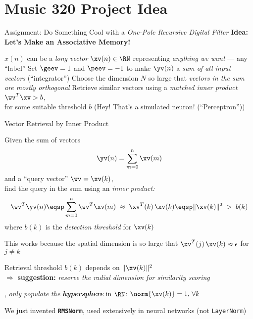 

%

%

\section[\sectopts,toc={Basic Idea}]{Music 320 Project Idea}

\begin{slide}[\slideopts,toc={One Pole Filter}]{Assignment: Do Something Cool with a \emph{One-Pole Recursive Digital Filter}}
\vspace{-1em}
\maybepause
\vspace{-1em}
\textbf{Idea: Let's Make an Associative Memory!}
\begin{itemize}
\mpitem $x(n)$ can be a \emph{long vector} $\xv(n)\in\RN$ representing \emph{anything we want} --- any ``label''
\mpitem Set $\geev = 1$ and $\peev = -1$ to make $\yv(n)$ a \emph{sum of all input vectors} (``integrator'')
\mpitem Choose the dimension $N$ so large that \emph{vectors in the sum are mostly orthogonal}
\mpitem Retrieve similar vectors using a \emph{matched inner product} $\wv^T\xv > b$,\\
        for some suitable threshold $b$ (Hey! That's a simulated neuron! (``Perceptron''))
\end{itemize}
\end{slide}

\begin{slide}[\slideopts,toc={Inner Product}]{Vector Retrieval by Inner Product}

  Given the sum of vectors
  \[
  \yv(n) = \sum_{m=0}^n \xv(m)
  \]
  and a ``query vector'' $\wv = \xv(k)$,\\
  \maybepause
  find the query in the sum using an \emph{inner product:}
  \[
  \wv^T\yv(n) \eqsp \sum_{m=0}^n \wv^T\xv(m) \;\approx\; \xv^T(k)\,\xv(k) \eqsp \|\xv(k)\|^2 \;>\; b(k)
  \]
  where $b(k)$ is the \emph{detection threshold} for $\xv(k)$

  \begin{itemize}
  \mpitem This works because the spatial dimension is so large that $\xv^T(j)\,\xv(k)\approx \epsilon$ for $j\ne k$

  \mpitem Retrieval threshold $b(k)$ depends on $\|\xv(k)\|^2$\\
  $\Rightarrow$ \textbf{suggestion:} \emph{reserve the radial dimension for similarity scoring}

  \mpitem \Ie, \emph{only populate the \textbf{hypersphere}} in $\RN$: $\norm{\xv(k)} = 1, \, \forall k$

  \mpitem We just invented \textbf{\texttt{RMSNorm}}, used extensively in neural networks (not \texttt{LayerNorm})

  \end{itemize}

\end{slide}

